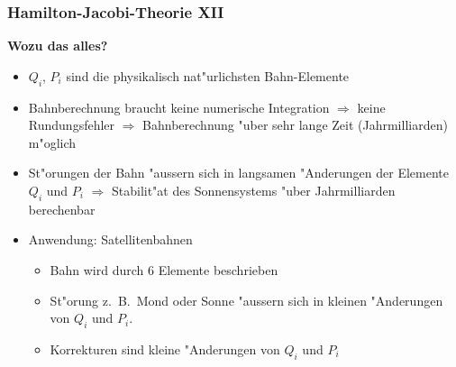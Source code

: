 \documentclass{beamer}
\begin{document}
\begin{frame}
\frametitle{Hamilton-Jacobi-Theorie XII}

{\bf Wozu das alles?}
\begin{itemize}
\item $Q_i$, $P_i$ sind die physikalisch nat"urlichsten Bahn-Elemente
\item Bahnberechnung braucht keine numerische Integration $\Rightarrow$
keine Rundungsfehler $\Rightarrow$ Bahnberechnung "uber sehr lange Zeit
(Jahrmilliarden) m"oglich
\item St"orungen der Bahn "aussern sich in langsamen "Anderungen der
Elemente $Q_i$ und $P_i$  $\Rightarrow$ Stabilit"at des Sonnensystems
"uber Jahrmilliarden berechenbar
\item Anwendung: Satellitenbahnen
\begin{itemize}
\item Bahn wird durch 6 Elemente beschrieben
\item St"orung z.~B.~Mond oder Sonne "aussern sich in kleinen "Anderungen
von $Q_i$ und $P_i$.
\item Korrekturen sind kleine "Anderungen von $Q_i$ und $P_i$
\end{itemize}
\end{itemize}
\end{frame}
\end{document}

